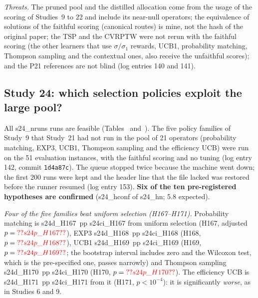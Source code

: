 \emph{Threats.} The pruned pool and the distilled allocation come from the usage of the scoring of Studies~9 to 22 and include its near-null operators; the equivalence of solutions of the faithful scoring (canonical routes) is mine, not the hash of the original paper; the TSP and the CVRPTW were not rerun with the faithful scoring (the other learners that use $\sigma/\sigma_1$ rewards, UCB1, probability matching, Thompson sampling and the contextual ones, also receive the unfaithful scores); and the P21 references are not blind (log entries 140 and 141).




\subsection{Study 24: which selection policies exploit the large pool?}\label{sec:s24}
All \num{s24_nruns} runs are feasible (Tables~ and~). The five policy families of Study~9 that Study~21 had not run in the pool of 21 operators (probability matching, EXP3, UCB1, Thompson sampling and the efficiency UCB) were run on the 51 evaluation instances, with the faithful scoring and no tuning (log entry 142, commit \texttt{1d4a87c}). The queue stopped twice because the machine went down; the first 200 runs were kept and the header line that the file lacked was restored before the runner resumed (log entry 153). \textbf{Six of the ten pre-registered hypotheses are confirmed} (\num{s24_hconf} of \num{s24_hn}; 5.8 expected).

\emph{Four of the five families beat uniform selection (H167--H171).} Probability matching is \num{s24d_H167}~pp \num{s24ci_H167} from uniform selection (H167, adjusted $p=\num{s24p_H167}$), EXP3 \num{s24d_H168}~pp \num{s24ci_H168} (H168, $p=\num{s24p_H168}$), UCB1 \num{s24d_H169}~pp \num{s24ci_H169} (H169, $p=\num{s24p_H169}$; the bootstrap interval includes zero and the Wilcoxon test, which is the pre-specified one, passes narrowly) and Thompson sampling \num{s24d_H170}~pp \num{s24ci_H170} (H170, $p=\num{s24p_H170}$). The efficiency UCB is \num{s24d_H171}~pp \num{s24ci_H171} from it (H171, $p<10^{-4}$): it is significantly \emph{worse}, as in Studies 6 and 9.

